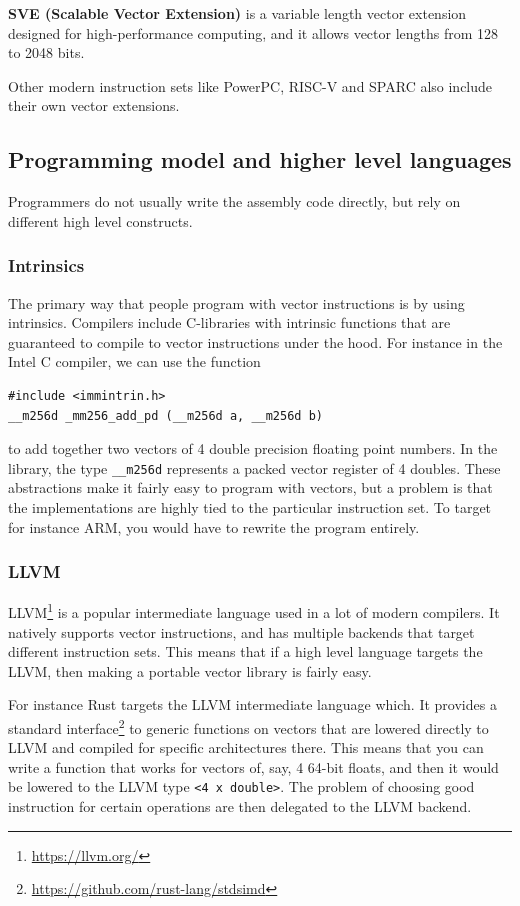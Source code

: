 \documentclass{article}
\begin{document}
\textbf{SVE (Scalable Vector Extension)}
is a variable length vector extension designed for high-performance computing, and it allows vector lengths from 128 to 2048 bits.

Other modern instruction sets like PowerPC, RISC-V and SPARC also include their own vector extensions.

\subsection{Programming model and higher level languages}
Programmers do not usually write the assembly code directly, but rely on different high level constructs.

\subsubsection{Intrinsics}

The primary way that people program with vector instructions is by using intrinsics. Compilers include C-libraries with intrinsic functions that are guaranteed to compile to vector instructions under the hood. For instance in the Intel C compiler, we can use the function
\begin{verbatim}
#include <immintrin.h>
__m256d _mm256_add_pd (__m256d a, __m256d b)
\end{verbatim}
to add together two vectors of 4 double precision floating point numbers. In the library, the type \verb!__m256d! represents a packed vector register of 4 doubles. These abstractions make it fairly easy to program with vectors, but a problem is that the implementations are highly tied to the particular instruction set. To target for instance ARM, you would have to rewrite the program entirely.

\subsubsection{LLVM}

LLVM\footnote{\url{https://llvm.org/}} is a popular intermediate language used in a lot of modern compilers. It natively supports vector instructions, and has multiple backends that target different instruction sets. This means that if a high level language targets the LLVM, then making a portable vector library is fairly easy.

For instance Rust targets the LLVM intermediate language which. It provides a standard interface\footnote{\url{https://github.com/rust-lang/stdsimd}} to generic functions on vectors that are lowered directly to LLVM and compiled for specific architectures there. This means that you can write a function that works for vectors of, say, 4 64-bit floats, and then it would be lowered to the LLVM type \verb!<4 x double>!. The problem of choosing good instruction for certain operations are then delegated to the LLVM backend.
\end{document}
